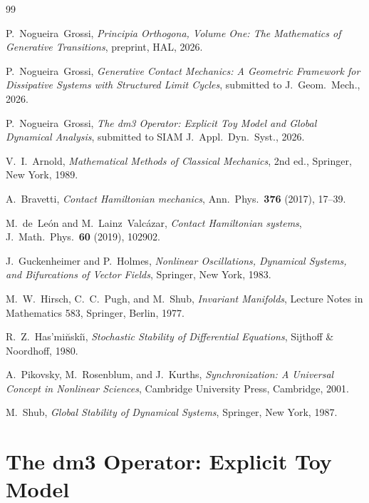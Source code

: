\documentclass[12pt, oneside]{book}
\theoremstyle{plain}
\theoremstyle{definition}
\theoremstyle{remark}
\begin{document}
\begin{thebibliography}{99}

P.~Nogueira~Grossi,
\emph{Principia Orthogona, Volume One: The Mathematics of
  Generative Transitions},
preprint, HAL, 2026.

P.~Nogueira~Grossi,
\emph{Generative Contact Mechanics: A Geometric Framework for
  Dissipative Systems with Structured Limit Cycles},
submitted to J.\ Geom.\ Mech., 2026.

P.~Nogueira~Grossi,
\emph{The dm3 Operator: Explicit Toy Model and Global Dynamical
  Analysis},
submitted to SIAM J.\ Appl.\ Dyn.\ Syst., 2026.

V.~I.~Arnold,
\emph{Mathematical Methods of Classical Mechanics},
2nd ed., Springer, New York, 1989.

A.~Bravetti,
\emph{Contact Hamiltonian mechanics},
Ann.\ Phys.\ \textbf{376} (2017), 17--39.

M.~de~Le{\'o}n and M.~Lainz~Valc{\'a}zar,
\emph{Contact Hamiltonian systems},
J.\ Math.\ Phys.\ \textbf{60} (2019), 102902.

J.~Guckenheimer and P.~Holmes,
\emph{Nonlinear Oscillations, Dynamical Systems, and Bifurcations
  of Vector Fields},
Springer, New York, 1983.

M.~W.~Hirsch, C.~C.~Pugh, and M.~Shub,
\emph{Invariant Manifolds},
Lecture Notes in Mathematics 583, Springer, Berlin, 1977.

R.~Z.~Has{'}mi{\u{n}}ski{\u{\i}},
\emph{Stochastic Stability of Differential Equations},
Sijthoff \& Noordhoff, 1980.

A.~Pikovsky, M.~Rosenblum, and J.~Kurths,
\emph{Synchronization: A Universal Concept in Nonlinear Sciences},
Cambridge University Press, Cambridge, 2001.

M.~Shub,
\emph{Global Stability of Dynamical Systems},
Springer, New York, 1987.

\end{thebibliography}
\cleardoublepage


\part{The dm3 Operator: Explicit Toy Model}
\end{document}
